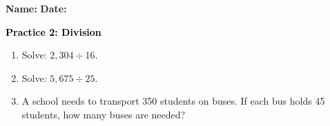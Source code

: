 \documentclass[12pt, letterpaper, fleqn]{article}
\begin{document}
\textbf{Name:} \underline{\hspace{5cm}}
\hfill
\textbf{Date:} \underline{\hspace{3cm}}\\

\begin{tcolorbox}[colback=customteal!20]
    \large\textcolor{black}{\textbf{Practice 2: Division}}
\end{tcolorbox}
\begin{enumerate}[itemsep=3.5cm, leftmargin=0.6cm]
\item Solve: $2,304 \div 16$.
\vspace{3.5cm}
\item Solve: $5,675 \div 25$.
\vspace{3.5cm}
\item A school needs to transport 350 students on buses. If each bus holds 45 students, how many buses are needed?
\end{enumerate}
\end{document}
